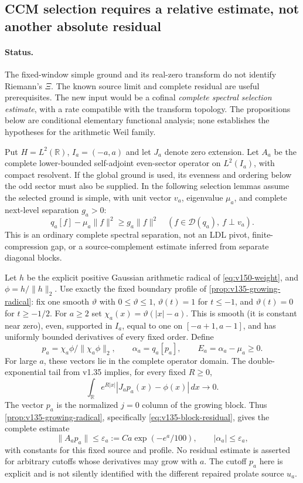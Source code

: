 \documentclass[11pt]{article}
\theoremstyle{remark}
\begin{document}

\subsection*{CCM selection requires a relative estimate, not another absolute residual}

\paragraph{Status.}
The fixed-window simple ground and its real-zero transform do not identify
Riemann's $\Xi$. The known source limit and complete residual are useful
prerequisites. The new input would be a cofinal \emph{complete spectral
selection estimate}, with a rate compatible with the transform topology.
The propositions below are conditional elementary functional analysis;
none establishes the hypotheses for the arithmetic Weil family.

Put $H=L^2(\mathbb R)$, $I_a=(-a,a)$ and let $J_a$ denote zero extension.
Let $A_a$ be the complete lower-bounded self-adjoint even-sector operator
on $L^2(I_a)$, with compact resolvent. If the global ground is used,
its evenness and ordering below the odd sector must also be supplied.
In the following selection lemmas assume the selected ground is simple,
with unit vector $v_a$, eigenvalue $\mu_a$, and complete next-level
separation $g_a>0$:
\[
 q_a[f]-\mu_a\|f\|^2\ge g_a\|f\|^2
 \quad(f\in\mathcal D(q_a),\ f\perp v_a).
\]
This is an ordinary complete spectral separation, not an LDL pivot,
finite-compression gap, or a source-complement estimate inferred from
separate diagonal blocks.

Let $h$ be the explicit positive Gaussian arithmetic radical of
\eqref{eq:v150-weight}, and $\phi=h/\|h\|_2$. Use exactly the fixed
boundary profile of \ref{prop:v135-growing-radical}: fix one smooth
$\vartheta$ with $0\le\vartheta\le1$, $\vartheta(t)=1$ for $t\le-1$,
and $\vartheta(t)=0$ for $t\ge-1/2$. For $a\ge2$ set
$\chi_a(x)=\vartheta(|x|-a)$. This is smooth (it is constant near zero),
even, supported in $I_a$, equal to one on $[-a+1,a-1]$, and has
uniformly bounded derivatives of every fixed order. Define
\[
 p_a=\chi_a\phi/\|\chi_a\phi\|_2,\qquad
 \alpha_a=q_a[p_a],\qquad E_a=\alpha_a-\mu_a\ge0.
\]
For large $a$, these vectors lie in the complete operator domain.
The double-exponential tail from v1.35 implies, for every fixed $R\ge0$,
\[
 \int_{\mathbb R}e^{R|x|}|J_ap_a(x)-\phi(x)|\,dx\longrightarrow0.
\]
The vector $p_a$ is the normalized $j=0$ column of the growing block.
Thus \ref{prop:v135-growing-radical}, specifically
\eqref{eq:v135-block-residual}, gives the complete estimate
\[
 \|A_ap_a\|\le\varepsilon_a:=Ca\exp(-e^a/100),\qquad
 |\alpha_a|\le\varepsilon_a,
\]
with constants for this fixed source and profile. No residual estimate
is asserted for arbitrary cutoffs whose derivatives may grow with $a$.
The cutoff $p_a$ here is explicit and is not silently identified with
the different repaired prolate source $u_a$.
\end{document}
